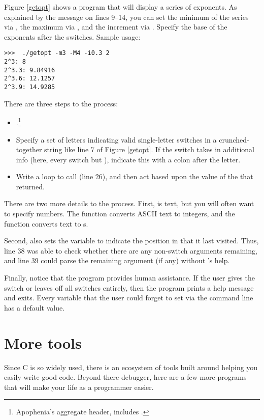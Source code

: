 Figure
\ref{getopt} shows a program that will display a series of exponents.
As explained by the message on lines 9--14, you can set the minimum of
the series via , the maximum via , and the increment via
. Specify the base of the exponents after the switches.
Sample usage:
\begin{lstlisting}
>>>  ./getopt -m3 -M4 -i0.3 2
2^3: 8
2^3.3: 9.84916
2^3.6: 12.1257
2^3.9: 14.9285
\end{lstlisting}

There are three steps to the process:
\begin{itemize}
\item {}.\footnote{Apophenia's aggregate header,
 includes .}
\item Specify a set of letters indicating valid single-letter switches in a crunched-together string like line 7 of Figure \ref{getopt}. If the switch
takes in additional info (here, every switch but ), indicate this with a colon after the letter. 
\item Write a  loop to call  (line 26), and then
act based upon the value of the  that  returned.
\end{itemize}

There are two more details to the process. First,  is text, but
you will often want to specify numbers. The function 
converts ASCII text to integers, and the function
 converts text to s. 

Second,  also sets the variable  to indicate the
position in  that it last visited. Thus, line 38 was able to
check whether there are any non-switch arguments remaining, and line 39
could parse the remaining argument (if any) without 's help.

Finally, notice that the program provides human assistance. If the user
gives the  switch or leaves off all switches entirely, then the
program prints a help message and exits. Every variable that the
user could forget to set via the command line has a default value.

\section{More tools} 
Since C is so widely used, there is an ecosystem of tools built around
helping you easily write good code.  Beyond there debugger, here are a
few more programs that will make your life as a programmer easier.

